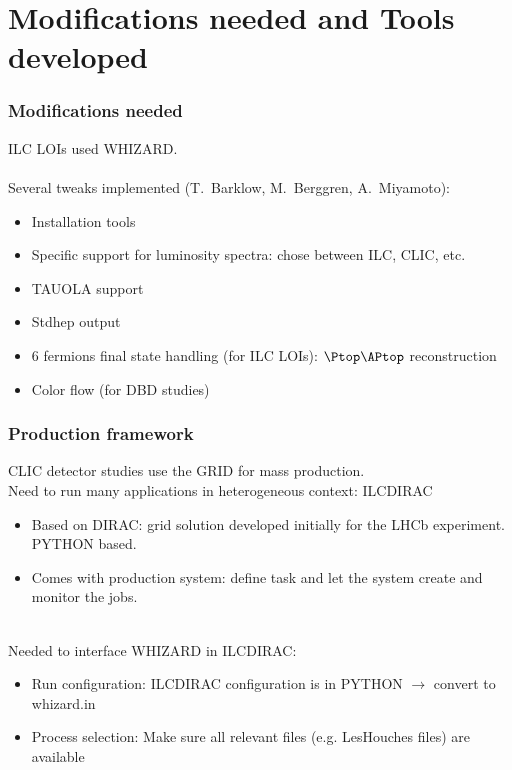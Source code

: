\documentclass{beamer}
\newcommand{\whizard}{WHIZARD\xspace}
\begin{document}
\section{Modifications needed and Tools developed}
\begin{frame}
\frametitle{Modifications needed}
ILC LOIs used \whizard.\\
~\\
Several tweaks implemented (T.~Barklow, M.~Berggren, A.~Miyamoto):
\begin{itemize}
  \item Installation tools
  \item Specific support for luminosity spectra: chose between ILC, CLIC, etc.
  \item TAUOLA support
  \item Stdhep output
  \item 6 fermions final state handling (for ILC LOIs): $\Ptop\APtop$
  reconstruction
  \item Color flow (for DBD studies)
\end{itemize}
\end{frame}

\begin{frame}
\frametitle{Production framework}
CLIC detector studies use the {\color{blue} GRID} for mass production.\\
Need to  run many applications in heterogeneous context: \alert{ILCDIRAC}
\begin{itemize}
  \item Based on DIRAC: grid solution developed initially for the LHCb
  experiment. {\color{blue}PYTHON} based.
  \item Comes with production system: define task and let the system create
  and monitor the jobs.
\end{itemize}
~\\
Needed to interface \whizard in ILCDIRAC:
\begin{itemize}
  \item Run configuration: ILCDIRAC configuration is in PYTHON $\to$ convert to
  whizard.in
  \item Process selection: Make sure all relevant files (e.g. LesHouches files)
  are available
\end{itemize}
\end{frame}
\end{document}

